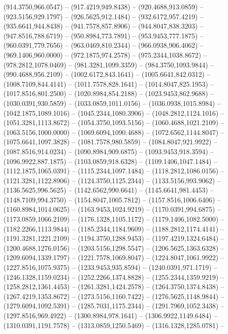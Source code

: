 \begin{scope}[y=0.80pt, x=0.80pt, yscale=-1.000000, xscale=1.000000, inner sep=0pt, outer sep=0pt]
    (914.3750,966.0547) -- (917.4219,949.8438) -- (920.4688,913.0859) --
    (923.5156,929.1797) -- (926.5625,912.1484) -- (932.6172,957.4219) --
    (935.6641,944.8438) -- (941.7578,857.8906) -- (944.8047,838.3203) --
    (947.8516,788.6719) -- (950.8984,773.7891) -- (953.9453,777.1875) --
    (960.0391,779.7656) -- (963.0469,810.2344) -- (966.0938,906.4062) --
    (969.1406,960.0000) -- (972.1875,974.2578) -- (975.2344,1038.8672) --
    (978.2812,1078.0469) -- (981.3281,1099.3359) -- (984.3750,1093.9844) --
    (990.4688,956.2109) -- (1002.6172,843.1641) -- (1005.6641,842.0312) --
    (1008.7109,844.4141) -- (1011.7578,828.1641) -- (1014.8047,825.1953) --
    (1017.8516,801.2500) -- (1020.8984,854.2188) -- (1023.9453,862.9688) --
    (1030.0391,930.5859) -- (1033.0859,1011.0156) -- (1036.0938,1015.8984) --
    (1042.1875,1089.1016) -- (1045.2344,1080.3906) -- (1048.2812,1124.1016) --
    (1051.3281,1113.8672) -- (1054.3750,1093.5156) -- (1060.4688,1021.2109) --
    (1063.5156,1000.0000) -- (1069.6094,1090.4688) -- (1072.6562,1144.8047) --
    (1075.6641,1097.3828) -- (1081.7578,980.5859) -- (1084.8047,921.9922) --
    (1087.8516,914.0234) -- (1090.8984,909.6875) -- (1093.9453,918.3594) --
    (1096.9922,887.1875) -- (1103.0859,918.6328) -- (1109.1406,1047.1484) --
    (1112.1875,1065.0391) -- (1115.2344,1097.1484) -- (1118.2812,1086.0156) --
    (1121.3281,1122.8906) -- (1124.3750,1125.2344) -- (1133.5156,993.9062) --
    (1136.5625,996.5625) -- (1142.6562,990.6641) -- (1145.6641,981.4453) --
    (1148.7109,994.3750) -- (1154.8047,1005.7812) -- (1157.8516,1006.6406) --
    (1160.8984,1014.0625) -- (1163.9453,1024.9219) -- (1170.0391,994.6875) --
    (1173.0859,1066.2109) -- (1176.1328,1105.1172) -- (1179.1406,1082.5000) --
    (1182.2266,1113.9844) -- (1185.2344,1184.9609) -- (1188.2812,1174.4141) --
    (1191.3281,1221.2109) -- (1194.3750,1288.9453) -- (1197.4219,1324.6484) --
    (1200.4688,1276.0156) -- (1203.5156,1298.5547) -- (1206.5625,1363.6328) --
    (1209.6094,1339.1797) -- (1221.7578,1069.8047) -- (1224.8047,1061.9922) --
    (1227.8516,1075.9375) -- (1233.9453,935.8594) -- (1240.0391,971.1719) --
    (1246.1328,1159.0234) -- (1252.2266,1374.8828) -- (1255.2344,1359.9219) --
    (1258.2812,1361.4453) -- (1261.3281,1424.2578) -- (1264.3750,1374.8438) --
    (1267.4219,1353.8672) -- (1273.5156,1160.7422) -- (1276.5625,1148.9844) --
    (1279.6094,1092.5391) -- (1285.7031,1175.2344) -- (1291.7969,1052.3438) --
    (1297.8516,969.4922) -- (1300.8984,978.1641) -- (1306.9922,1149.6484) --
    (1310.0391,1191.7578) -- (1313.0859,1250.5469) -- (1316.1328,1285.0781) --

\end{scope}
